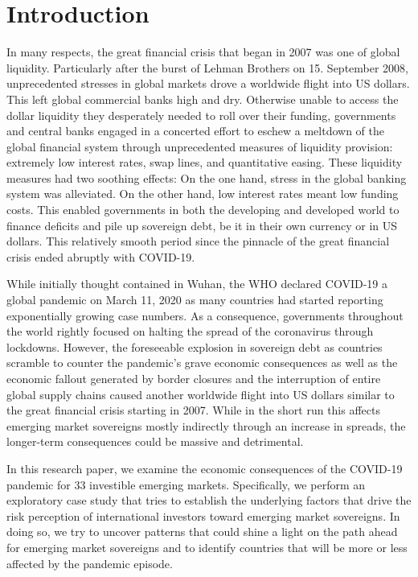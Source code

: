 \documentclass[11pt,]{article}
\begin{document}
\vskip -8.5pt



\noindent  

\hypertarget{introduction}{%
\section{Introduction}\label{introduction}}

In many respects, the great financial crisis that began in 2007 was one
of global liquidity. Particularly after the burst of Lehman Brothers on
15. September 2008, unprecedented stresses in global markets drove a
worldwide flight into US dollars. This left global commercial banks high
and dry. Otherwise unable to access the dollar liquidity they
desperately needed to roll over their funding, governments and central
banks engaged in a concerted effort to eschew a meltdown of the global
financial system through unprecedented measures of liquidity provision:
extremely low interest rates, swap lines, and quantitative easing. These
liquidity measures had two soothing effects: On the one hand, stress in
the global banking system was alleviated. On the other hand, low
interest rates meant low funding costs. This enabled governments in both
the developing and developed world to finance deficits and pile up
sovereign debt, be it in their own currency or in US dollars. This
relatively smooth period since the pinnacle of the great financial
crisis ended abruptly with COVID-19.

While initially thought contained in Wuhan, the WHO declared COVID-19 a
global pandemic on March 11, 2020 as many countries had started
reporting exponentially growing case numbers. As a consequence,
governments throughout the world rightly focused on halting the spread
of the coronavirus through lockdowns. However, the foreseeable explosion
in sovereign debt as countries scramble to counter the pandemic's grave
economic consequences as well as the economic fallout generated by
border closures and the interruption of entire global supply chains
caused another worldwide flight into US dollars similar to the great
financial crisis starting in 2007. While in the short run this affects
emerging market sovereigns mostly indirectly through an increase in
spreads, the longer-term consequences could be massive and detrimental.

In this research paper, we examine the economic consequences of the
COVID-19 pandemic for 33 investible emerging markets. Specifically, we
perform an exploratory case study that tries to establish the underlying
factors that drive the risk perception of international investors toward
emerging market sovereigns. In doing so, we try to uncover patterns that
could shine a light on the path ahead for emerging market sovereigns and
to identify countries that will be more or less affected by the pandemic
episode.
\end{document}
